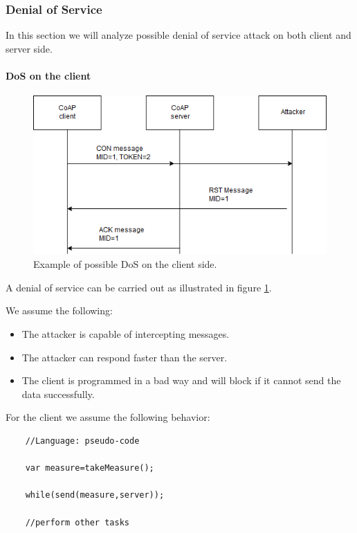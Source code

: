 	\subsubsection{Denial of Service}
	In this section we will analyze possible denial of service attack on both client and server side.
	
	\paragraph{DoS on the client}
	\begin{figure}
		\includegraphics[width=\linewidth]{coap-vuln-img0.png}
		\caption{Example of possible DoS on the client side.}
		\label{fig:coap-vuln0}
	\end{figure}
	A denial of service can be carried out as illustrated in figure \ref{fig:coap-vuln0}.\newline
	
	We assume the following:
	\begin{itemize}
		\item The attacker is capable of intercepting messages.
		\item The attacker can respond faster than the server.
		\item The client is programmed in a bad way and will block if it cannot send the data successfully.
	\end{itemize}

	For the client we assume the following behavior:
	\begin{lstlisting}
	//Language: pseudo-code
	
	var measure=takeMeasure();
	
	while(send(measure,server));
	
	//perform other tasks
	\end{lstlisting}
	
